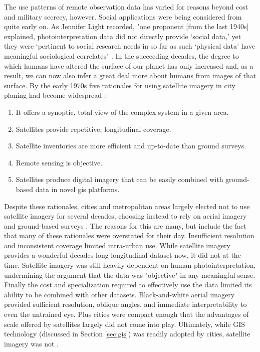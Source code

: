 The use patterns of remote observation data has varied for reasons beyond cost and military secrecy, however. Social applications were being considered from quite early on. As Jennifer Light recorded, "one proponent [from the last 1940s] explained, photointerpretation data did not directly provide `social data,' yet they were `pertinent to social research needs in so far as such `physical data' have meaningful sociological correlates" \cite{lightWarfareWelfareDefense2005}. In the succeeding decades, the degree to which humans have altered the surface of our planet has only increased and, as a result, we can now also infer a great deal more about humans from images of that surface. By the early 1970s five rationales for using satellite imagery in city planing had become widespread \cite{lightWarfareWelfareDefense2005}:

\begin{enumerate}[itemsep=0pt,parsep=0pt]
	\item{It offers a synoptic, total view of the complex system in a given area.}
	\item{Satellites provide repetitive, longitudinal coverage.}
	\item{Satellite inventories are more efficient and up-to-date than ground surveys.}
	\item{Remote sensing is objective.}
	\item{Satellites produce digital imagery that can be easily combined with ground-based data in novel \ac{gis} platforms.}
\end{enumerate}

Despite these rationales, cities and metropolitan areas largely elected not to use satellite imagery for several decades, choosing instead to rely on aerial imagery and ground-based surveys \cite{lightWarfareWelfareDefense2005}. The reasons for this are many, but include the fact that many of these rationales were overstated for their day. Insufficient resolution and inconsistent coverage limited intra-urban use. While satellite imagery provides a wonderful decades-long longitudinal dataset now, it did not at the time. Satellite imagery was still heavily dependent on human photointerpretation, undermining the argument that the data was "objective" in any meaningful sense. Finally the cost and specialization required to effectively use the data limited its ability to be combined with other datasets. Black-and-white aerial imagery provided sufficient resolution, oblique angles, and immediate interpretability to even the untrained eye. Plus cities were compact enough that the advantages of scale offered by satellites largely did not come into play. Ultimately, while GIS technology (discussed in Section \ref{sec:gis}) was readily adopted by cities, satellite imagery was not \cite{lightWarfareWelfareDefense2005}.

